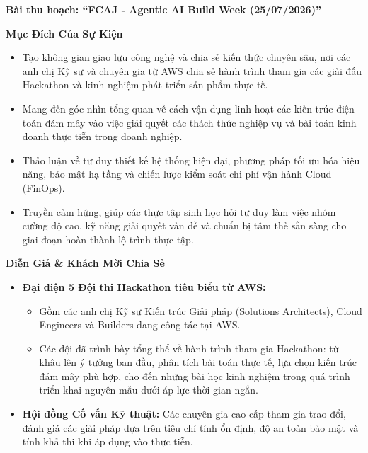 \vspace{0.5em}\noindent\textbf{Bài thu hoạch: ``FCAJ - Agentic AI Build Week (25/07/2026)''}

\vspace{0.5em}\noindent\textbf{Mục Đích Của Sự Kiện}

\begin{itemize}
\tightlist
\item
  Tạo không gian giao lưu công nghệ và chia sẻ kiến thức chuyên sâu, nơi
  các anh chị Kỹ sư và chuyên gia từ AWS chia sẻ hành trình tham gia các
  giải đấu Hackathon và kinh nghiệm phát triển sản phẩm thực tế.
\item
  Mang đến góc nhìn tổng quan về cách vận dụng linh hoạt các kiến trúc
  điện toán đám mây vào việc giải quyết các thách thức nghiệp vụ và bài
  toán kinh doanh thực tiễn trong doanh nghiệp.
\item
  Thảo luận về tư duy thiết kế hệ thống hiện đại, phương pháp tối ưu hóa
  hiệu năng, bảo mật hạ tầng và chiến lược kiểm soát chi phí vận hành
  Cloud (FinOps).
\item
  Truyền cảm hứng, giúp các thực tập sinh học hỏi tư duy làm việc nhóm
  cường độ cao, kỹ năng giải quyết vấn đề và chuẩn bị tâm thế sẵn sàng
  cho giai đoạn hoàn thành lộ trình thực tập.
\end{itemize}

\vspace{0.5em}\noindent\textbf{Diễn Giả \& Khách Mời Chia Sẻ}

\begin{itemize}
\tightlist
\item
  \textbf{Đại diện 5 Đội thi Hackathon tiêu biểu từ AWS:}

  \begin{itemize}
  \tightlist
  \item
    Gồm các anh chị Kỹ sư Kiến trúc Giải pháp (Solutions Architects),
    Cloud Engineers và Builders đang công tác tại AWS.
  \item
    Các đội đã trình bày tổng thể về hành trình tham gia Hackathon: từ
    khâu lên ý tưởng ban đầu, phân tích bài toán thực tế, lựa chọn kiến
    trúc đám mây phù hợp, cho đến những bài học kinh nghiệm trong quá
    trình triển khai nguyên mẫu dưới áp lực thời gian ngắn.
  \end{itemize}
\item
  \textbf{Hội đồng Cố vấn Kỹ thuật:} Các chuyên gia cao cấp tham gia
  trao đổi, đánh giá các giải pháp dựa trên tiêu chí tính ổn định, độ an
  toàn bảo mật và tính khả thi khi áp dụng vào thực tiễn.
\end{itemize}

